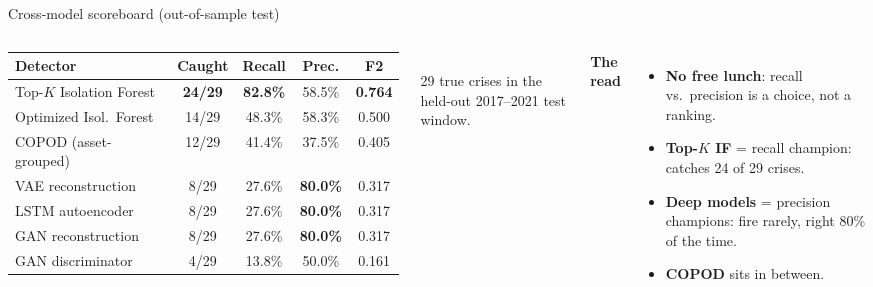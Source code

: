 \documentclass[10pt,aspectratio=169]{beamer}
\begin{document}
\begin{frame}{Cross-model scoreboard (out-of-sample test)}
	\begin{columns}[T,onlytextwidth]
		\vspace{0.3em}
		\small
			\setlength{\tabcolsep}{3.5pt}
		\begin{tabular}{lcccc}
			\toprule
			Detector                  & Caught         & Recall          & Prec.           & F2             \\
			\midrule
			Top-$K$ Isolation Forest  & \textbf{24/29} & \textbf{82.8\%} & 58.5\%          & \textbf{0.764} \\
			Optimized Isol.\ Forest   & 14/29          & 48.3\%          & 58.3\%          & 0.500          \\
			COPOD (asset-grouped)     & 12/29          & 41.4\%          & 37.5\%          & 0.405          \\
			VAE reconstruction        & 8/29           & 27.6\%          & \textbf{80.0\%} & 0.317          \\
			LSTM autoencoder          & 8/29           & 27.6\%          & \textbf{80.0\%} & 0.317          \\
			GAN reconstruction        & 8/29           & 27.6\%          & \textbf{80.0\%} & 0.317          \\
			GAN discriminator         & 4/29           & 13.8\%          & 50.0\%          & 0.161          \\
			\bottomrule
		\end{tabular}
		\vspace{0.4em}\\
		{\scriptsize 29 true crises in the held-out 2017--2021 test window.}

		\textcolor{accent}{\textbf{The read}}
		\begin{itemize}\small
			\item \textbf{No free lunch}: recall vs.\ precision is a choice, not a ranking.
			\item \textbf{Top-$K$ IF} = recall champion: catches 24 of 29 crises.
			\item \textbf{Deep models} = precision champions: fire rarely, right 80\% of the time.
			\item \textbf{COPOD} sits in between.
		\end{itemize}
	\end{columns}
\end{frame}
\end{document}
